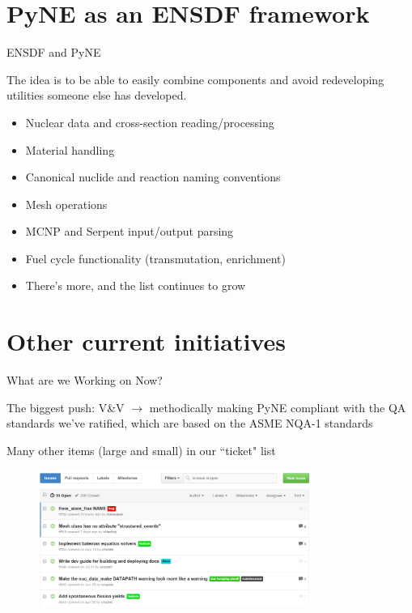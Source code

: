 \documentclass[xcolor=x11names,compress]{beamer}
\renewcommand{\(}{\begin{columns}}
\renewcommand{\)}{\end{columns}}
\newcommand{\<}[1]{\begin{column}{#1}}
\renewcommand{\>}{\end{column}}
\begin{document}
\section{PyNE as an ENSDF framework}
\begin{frame}{ENSDF and PyNE}

    The idea is to be able to easily combine components and avoid redeveloping
    utilities someone else has developed.

    \begin{itemize}
    \item Nuclear data and cross-section reading/processing
    \item Material handling
    \item Canonical nuclide and reaction naming conventions
    \item Mesh operations
    \item MCNP and Serpent input/output parsing
    \item Fuel cycle functionality (transmutation, enrichment)
    \item There's more, and the list continues to grow
    \end{itemize}
    
\end{frame}

\section{Other current initiatives}
\begin{frame}{What are we Working on Now?}

    The biggest push: \textcolor{dgreen}{V\&V} $\rightarrow$ methodically making PyNE compliant 
    with the QA standards we've ratified, which are based on the ASME NQA-1 standards
    \cite{pyne_vnv}

    \vspace*{1 em}
    Many other items (large and small) in our ``ticket" list
    
    \begin{center}
 	\begin{figure}
 	\includegraphics[height=1.75in,clip]{../figs/PyNE-tickets}
    \end{figure}
 	\end{center}
    
\end{frame}
\end{document}
